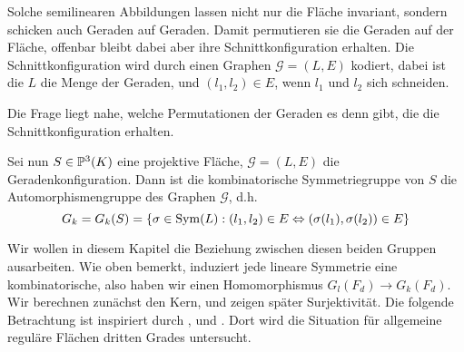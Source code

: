 Solche semilinearen Abbildungen lassen nicht nur die Fläche invariant, sondern schicken auch Geraden auf Geraden. Damit permutieren sie die Geraden auf der Fläche, offenbar bleibt dabei aber ihre Schnittkonfiguration erhalten. Die Schnittkonfiguration wird durch einen Graphen $\mathcal G = (L,E)$ kodiert, dabei ist die $L$ die Menge der Geraden, und $(l_1, l_2) \in E$, wenn $l_1$ und $l_2$ sich schneiden.

Die Frage liegt nahe, welche Permutationen der Geraden es denn gibt, die die Schnittkonfiguration erhalten.
\begin{defin}
Sei nun $S \in \mathbb P^{3}(K)$ eine projektive Fläche, $\mathcal G = (L,E)$ die Geradenkonfiguration. Dann ist die kombinatorische Symmetriegruppe von $S$ die Automorphismengruppe des Graphen $\mathcal G$, d.h.
\begin{equation}
G_k = G_k(S) = \{ \sigma \in \operatorname{Sym}(L): (l_1, l_2) \in E \Leftrightarrow (\sigma(l_1), \sigma(l_2)) \in E \}
\end{equation}
\end{defin}

Wir wollen in diesem Kapitel die Beziehung zwischen diesen beiden Gruppen ausarbeiten. Wie oben bemerkt, induziert jede lineare Symmetrie eine kombinatorische, also haben wir einen Homomorphismus $G_l(F_d) \to G_k(F_d)$. Wir berechnen zunächst den Kern, und zeigen später Surjektivität. Die folgende Betrachtung ist inspiriert durch \cite[Bem.~4.10.1, S.~404]{Hartshorne}, und \cite[Aufg. C--D, S.~180]{Mumford}. Dort wird die Situation für allgemeine reguläre Flächen dritten Grades untersucht.

